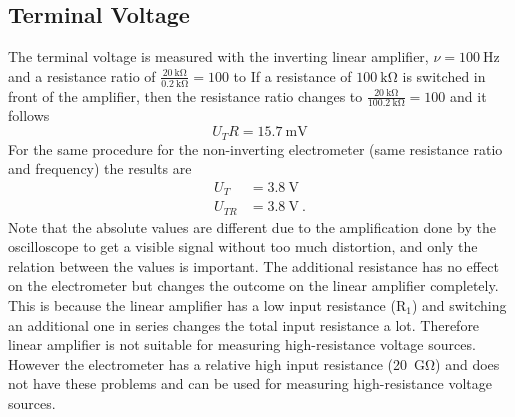 \subsection{Terminal Voltage}
The terminal voltage is measured with the inverting linear amplifier, $\nu = \SI{100}{\hertz}$ and a resistance ratio of $\frac{\SI{20}{\kilo\ohm}}{\SI{0.2}{\kilo\ohm}} = 100$ to
If a resistance of $\SI{100}{\kilo\ohm}$ is switched in front of the amplifier, then the resistance ratio changes to $\frac{\SI{20}{\kilo\ohm}}{\SI{100.2}{\kilo\ohm}} = 100$ and it follows
\begin{equation*}
U_TR = \SI{15.7}{\milli\volt}
\end{equation*}
For the same procedure for the non-inverting electrometer (same resistance ratio and frequency) the results are
\begin{align*}
U_T &= \SI{3.8}{\volt} \\
U_{TR} &= \SI{3.8}{\volt} \ .
\end{align*}
Note that the absolute values are different due to the amplification done by the oscilloscope to get a visible signal without too much distortion, and only the
relation between the values is important.
The additional resistance has no effect on the electrometer but changes the outcome on the linear amplifier completely. This is because the linear amplifier has
a low input resistance (\approx $\text{R}_\text{1}$) and switching an additional one in series changes the total input resistance a lot. Therefore linear amplifier
is not suitable for measuring high-resistance voltage sources. However the electrometer has a relative high input resistance (\approx \SI{20}{\giga\ohm}) and does not
have these problems and can be used for measuring high-resistance voltage sources.

